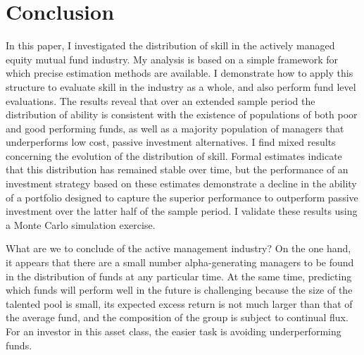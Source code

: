 \section{Conclusion}
	In this paper, I investigated the distribution of skill in the actively managed equity mutual fund industry. My analysis is based on a simple framework for which precise estimation methods are available. I demonstrate how to apply this structure to evaluate skill in the industry as a whole, and also perform fund level evaluations. The results reveal that over an extended sample period the distribution of ability is consistent with the existence of populations of both poor and good performing funds, as well as a majority population of managers that underperforms low cost, passive investment alternatives. I find mixed results concerning the evolution of the distribution of skill. Formal estimates indicate that this distribution has remained stable over time, but the performance of an investment strategy based on these estimates demonstrate a decline in the ability of a portfolio designed to capture the superior performance to outperform passive investment over the latter half of the sample period. I validate these results using a Monte Carlo simulation exercise.

	What are we to conclude of the active management industry? On the one hand, it appears that there are a small number alpha-generating managers to be found in the distribution of funds at any particular time. At the same time, predicting which funds will perform well in the future is challenging because the size of the talented pool is small, its expected excess return is not much larger than that of the average fund, and the composition of the group is subject to continual flux. For an investor in this asset class, the easier task is avoiding underperforming funds.

